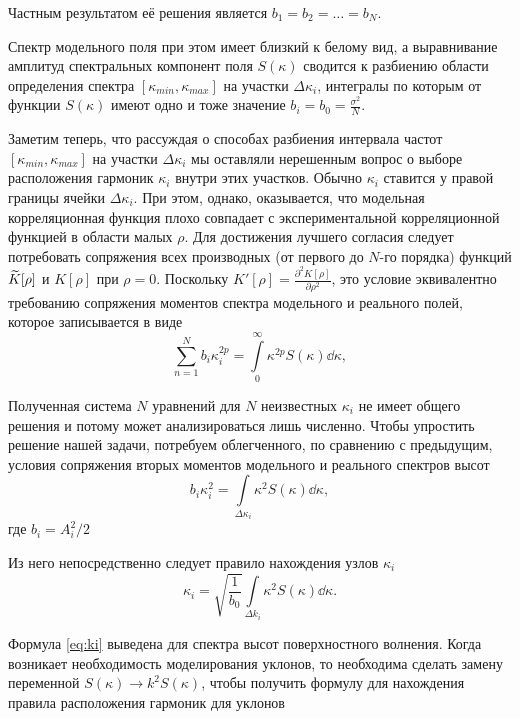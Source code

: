 Частным результатом её решения является $b_1 = b_2 = \dots = b_N$.

Спектр модельного поля при этом имеет близкий к белому вид, а выравнивание
амплитуд спектральных компонент поля $S(\kappa)$ сводится к разбиению области
определения спектра $[\kappa_{min},\kappa_{max}]$ на участки $\Delta
\kappa_i$, интегралы по
которым от функции  $S(\kappa)$ имеют одно и тоже значение $b_i = b_{0} =
\frac{\sigma^2}{N}$.

Заметим теперь, что рассуждая о способах разбиения интервала частот
$[\kappa_{min},
\kappa_{max}]$ на участки $\Delta \kappa_i$ мы оставляли нерешенным вопрос о выборе
расположения гармоник $\kappa_i$ внутри этих участков. Обычно  $\kappa_i$ ставится у
правой границы ячейки  $\Delta \kappa_i$. При этом, однако, оказывается, что
модельная корреляционная функция плохо совпадает с экспериментальной
корреляционной функцией в области малых  $\rho$. Для достижения лучшего
согласия следует потребовать сопряжения всех производных (от первого до $N$-го
порядка) функций $\widetilde K[\rho]$ и  $K[\rho]$ при  $\rho=0$. 
Поскольку $K'[\rho] = \frac{\partial^2 K[\rho]}{\partial \rho^2}$, это условие эквивалентно
требованию сопряжения моментов спектра модельного и реального полей, которое
записывается в виде
 \begin{equation}
    \sum\limits_{n=1}^{N} b_i \kappa_i^{2p} 
    = \int\limits_{0}^{\infty} \kappa^{2p}S(\kappa) \dd \kappa, 
\end{equation}

Полученная система $N$ уравнений для $N$ неизвестных $\kappa_i$ не имеет общего
решения и потому может анализироваться лишь численно. Чтобы упростить решение
нашей задачи, потребуем облегченного, по сравнению с предыдущим, условия
сопряжения вторых моментов модельного и реального спектров высот
 \begin{equation}
    b_i \kappa_i^2 = \int\limits_{\Delta \kappa_i} \kappa^2 S(\kappa) \dd \kappa,
\end{equation}
где $b_i= A_i^2 / 2$

Из него непосредственно следует правило нахождения узлов $\kappa_i$ 
\begin{equation}
    \label{eq:ki}
    \boxed{
        \kappa_i = \sqrt{\frac{1}{b_0}} \int\limits_{\Delta k_i} \kappa^2
        S(\kappa) \dd \kappa. 
    }
\end{equation}

Формула \eqref{eq:ki} выведена для спектра высот поверхностного волнения. Когда
возникает необходимость моделирования уклонов, то необходима сделать замену
переменной $S(\kappa) \to k^2 S(\kappa)$, чтобы получить формулу для нахождения правила
расположения гармоник для уклонов

